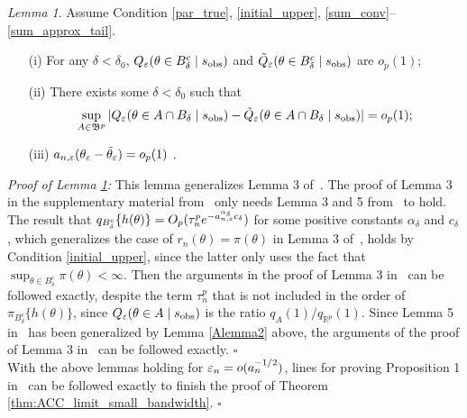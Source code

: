 \documentclass[9pt]{article}
\theoremstyle{remark}
\newtheorem{lemma}{Lemma}
\begin{document}
\begin{lemma}\label{Alemma4} 
Assume Condition \ref{par_true}, \ref{initial_upper}, \ref{sum_conv}--\ref{sum_approx_tail}. 
	\begin{enumerate}
		\item[(i)] For any $\delta<\delta_{0}$, $Q_{\varepsilon}(\theta\in B_{\delta}^{c}\mid s_{\rm obs})$
		and $\tilde{Q}_{\varepsilon}(\theta\in B_{\delta}^{c}\mid s_{\rm obs})$ are $o_{p}(1)$; 
		\item[(ii)] There exists some $\delta<\delta_{0}$ such that 
		\[
		\sup_{A\in\mathfrak{B}^{p}}|Q_{\varepsilon}(\theta\in A\cap B_{\delta}\mid s_{\rm obs})-\tilde{Q}_{\varepsilon}(\theta\in A\cap B_{\delta}\mid s_{\rm obs})|=o_{p}(1);
		\]
		\item[(iii)] $a_{n,\varepsilon}(\theta_{\varepsilon}-\tilde{\theta}_{\varepsilon})=o_{p}(1)$ . 
	\end{enumerate}\end{lemma}
{\it Proof of Lemma \ref{Alemma4}:} 
	This lemma generalizes Lemma 3 of~\cite{Li2017}. The proof of Lemma 3 in the supplementary material from~\cite{Li2017} only needs Lemma 3 and 5 from~\cite{Li2016} to hold. The result that  $q_{B_{\delta}^{c}}\{h(\theta)\}=O_{p}(\tau_{n}^{p}e^{-a_{n,\varepsilon}^{\alpha_{\delta}}c_{\delta}})$
	for some positive constants $\alpha_{\delta}$ and $c_{\delta}$, which generalizes the case of $r_{n}(\theta)=\pi(\theta)$ in Lemma 3 of~\cite{Li2016}, holds by Condition \ref{initial_upper}, since the latter only uses the fact that 
	$\sup_{\theta\in B_{\delta}^{c}}\pi(\theta)<\infty$.
	Then the arguments in the proof of Lemma 3 in~\cite{Li2016} can be followed exactly, despite the term $\tau_{n}^{p}$ that is not included in the order of $\pi_{B_{\delta}^{c}}\{h(\theta)\}$, since $Q_{\varepsilon}(\theta\in A\mid s_{{\rm obs}})$
	is the ratio $q_{A}(1)/q_{\mathbb{R}^{p}}(1)$. Since Lemma 5 in~\cite{Li2016} has been generalized by Lemma \eqref{Alemma2} above, the arguments of the proof of Lemma 3 in~\cite{Li2017} can be followed exactly.
	\hfill{$\square$} \\
	

With the above lemmas holding for $\varepsilon_n = o(a_n^{-1/2})$, lines for
proving %
Proposition 1 in~\cite{Li2017} can be followed  
exactly to finish the proof of Theorem \ref{thm:ACC_limit_small_bandwidth}. 
\hfill{$\square$} 
\end{document}

